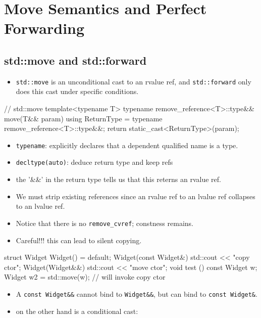 \section{Move Semantics and Perfect Forwarding}\label{sec:move}

\subsection{std::move and std::forward}
\begin{itemize}
  \item \texttt{std::move} is an unconditional cast to an rvalue ref, and \texttt{std::forward} only does this cast under specific conditions.
\end{itemize}
\begin{cppcode}
// std::move 
template<typename T>
typename remove_reference<T>::type&&
move(T&& param) {
  using ReturnType = typename remove_reference<T>::type&&;
  return static_cast<ReturnType>(param);
}
\end{cppcode}
\begin{itemize}
  \item \texttt{typename}: explicitly declares that a dependent qualified name is a type.
  \item \texttt{decltype(auto)}: deduce return type and keep refs
  \item the '\&\&' in the return type tells us that this reterns an rvalue ref.
  \item We must strip existing references since an rvalue ref to an lvalue ref collapses to an lvalue ref.
  \item Notice that there is no \texttt{remove\_cvref}; constness remains. 
  \item Careful!!! this can lead to silent copying.
\end{itemize}
\begin{cppcode}
struct Widget {
  Widget() = default;
  Widget(const Widget&) {std::cout << "copy ctor\n";}
  Widget(Widget&&) {std::cout << "move ctor\n";}
}
void test () {
  const Widget w;
  Widget w2 = std::move(w); // will invoke copy ctor
}
\end{cppcode}
\begin{itemize}
  \item A \texttt{const Widget\&\&} cannot bind to \texttt{Widget\&\&}, but can bind to \texttt{const Widget\&}.
  \item {} on the other hand is a conditional cast:
\end{itemize}
